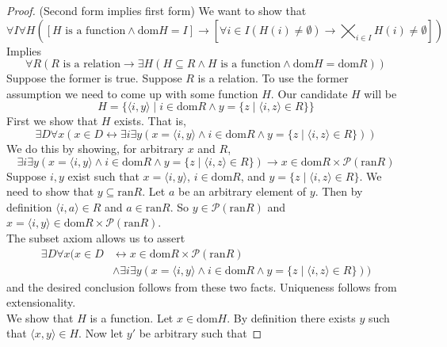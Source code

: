 \documentclass{report}
\begin{document}
\begin{proof}(Second form implies first form)
We want to show that 
\begin{equation*}
\forall I\forall H([H\text{ is a function}\land\text{dom}H=I]\to[\forall i\in I(H(i)\neq\emptyset)\to \bigtimes_{i\in I}H(i)\neq\emptyset])
\end{equation*}
Implies
\begin{equation*}
\forall R(R\text{ is a relation}\to\exists H(H\subseteq R\land\text{$H$ is a function}\land\text{dom}H=\text{dom}R))
\end{equation*}
Suppose the former is true. Suppose $R$ is a relation. To use the former assumption we need to come up with some function $H$. Our candidate $H$ will be
\begin{equation*}
H=\{\langle i,y\rangle\mid i\in\text{dom}R\land y=\{z\mid\langle i,z\rangle\in R\}\}
\end{equation*}
First we show that $H$ exists. That is,
\begin{equation*}
\exists D\forall x(x\in D\leftrightarrow\exists i\exists y(x=\langle i,y\rangle\land i\in\text{dom}R\land y=\{z\mid\langle i,z\rangle\in R\}))
\end{equation*}
We do this by showing, for arbitrary $x$ and $R$,
\begin{equation*}
\exists i\exists y(x=\langle i,y\rangle\land i\in\text{dom}R\land y=\{z\mid\langle i,z\rangle\in R\})\to x\in\text{dom}R\times\mathscr P(\text{ran}R)
\end{equation*}
Suppose $i,y$ exist such that $x=\langle i,y\rangle$, $i\in\text{dom}R$, and $y=\{z\mid\langle i,z\rangle\in R\}$. We need to show that $y\subseteq\text{ran}R$. 
Let $a$ be an arbitrary element of $y$. Then by definition $\langle i,a\rangle\in R$ and $a\in\text{ran}R$. So $y\in\mathscr P(\text{ran}R)$ and 
$x=\langle i,y\rangle\in\text{dom}R\times\mathscr P(\text{ran}R)$.\\
\indent The subset axiom allows us to assert
\begin{align*}
\exists D\forall x(x\in D&\leftrightarrow x\in\text{dom}R\times\mathscr P(\text{ran}R)\\&\land\exists i\exists y(x=\langle i,y\rangle\land i\in\text{dom}R\land y=\{z\mid\langle i,z\rangle\in R\}))
\end{align*}
and the desired conclusion follows from these two facts. Uniqueness follows from extensionality.\\
\indent We show that $H$ is a function. Let $x\in\text{dom}H$. By definition there exists $y$ such that $\langle x,y\rangle\in H$. Now let $y'$ be arbitrary such that 

\end{proof}
\end{document}
